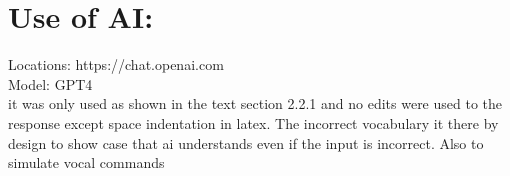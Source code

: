 \appendix

\chapter{Use of AI:}

Locations:  https://chat.openai.com\\
Model: GPT4
\\

it was only used as shown in the text section 2.2.1 and no edits were used to the response except space indentation in latex.
The incorrect vocabulary it there by design to show case that ai understands even if the input is incorrect. Also to simulate vocal commands